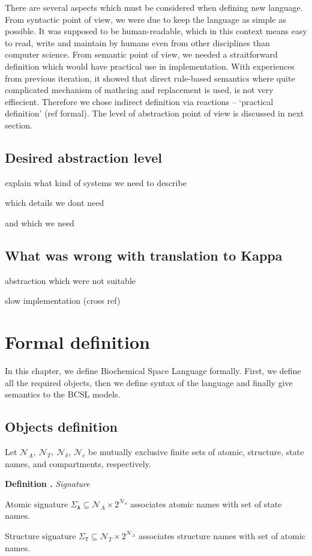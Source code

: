 \documentclass[12pt]{fithesis2}
\newcounter{counter}[section]
\renewcommand{\thecounter}{\thesection.\arabic{counter}}
\newenvironment{definition}[1]{\bigskip\refstepcounter{counter}\noindent\textbf{Definition \thecounter } \textit{#1} \par\nopagebreak}{\bigskip}
\begin{document}
There are several aspects which must be considered when defining new language. From syntactic point of view, we were due to keep the language as simple as possible. It was supposed to be human-readable, which in this context means easy to read, write and maintain by humans even from other disciplines than computer science. From semantic point of view, we needed a straitforward definition which would have practical use in implementation. With experiences from previous iteration, it showed that direct rule-based semantics where quite complicated mechanism of mathcing and replacement is used, is not very effiecient. Therefore we chose indirect definition via reactions -- `practical definition' (ref formal). The level of abstraction point of view is discussed in next section.

\section{Desired abstraction level}

explain what kind of systems we need to describe

which details we dont need

and which we need

\section{What was wrong with translation to Kappa}

abstraction which were not suitable

slow implementation (cross ref)

\chapter{Formal definition}

In this chapter, we define Biochemical Space Language formally. First, we define all the required objects, then we define syntax of the language and finally give semantics to the BCSL models.

\section{Objects definition}

Let $\mathcal{N}_{A},~\mathcal{N}_{T},~\mathcal{N}_{\delta},~\mathcal{N}_{c}$ be mutually exclusive finite sets of atomic, structure, state names, and compartments, respectively.

\begin{definition}{Signature}
Atomic signature $\Sigma_{\mathtt{A}} \subseteq \mathcal{N}_{A} \times 2^{\mathcal{N}_{\delta}}$ associates atomic names with set of state names. 

Structure signature $\Sigma_{\mathtt{T}} \subseteq \mathcal{N}_{T} \times 2^{\mathcal{N}_{A}}$ associates structure names with set of atomic names. 
\end{definition}
\end{document}
